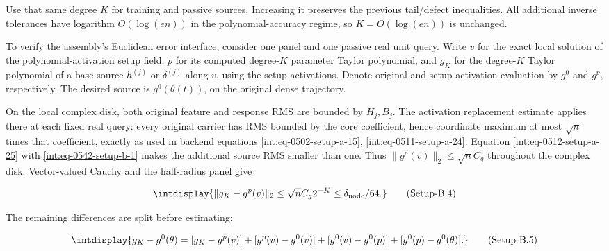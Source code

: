 
Use that same degree \(K\) for training and passive sources. Increasing it preserves the previous tail/defect inequalities. All additional inverse tolerances have logarithm \(O(\log(en))\) in the polynomial-accuracy regime, so \(K=O(\log(en))\) is unchanged.



To verify the assembly's Euclidean error interface, consider one panel and one passive real unit query. Write \(v\) for the exact local solution of the polynomial-activation setup field, \(p\) for its computed degree-\(K\) parameter Taylor polynomial, and \(g_K\) for the degree-\(K\) Taylor polynomial of a base source \(h^{(j)}\) or \(\delta^{(j)}\) along \(v\), using the setup activations. Denote original and setup activation evaluation by \(g^0\) and \(g^p\), respectively. The desired source is \(g^0(\theta(t))\), on the original dense trajectory.



On the local complex disk, both original feature and response RMS are bounded by \(H_j,\allowbreak B_j\). The activation replacement estimate applies there at each fixed real query: every original carrier has RMS bounded by the core coefficient, hence coordinate maximum at most \(\sqrt n\) times that coefficient, exactly as used in backend equations \hyperref[int:eq-setup-a-15]{\eqref{int:eq-0502-setup-a-15}}, \hyperref[int:eq-setup-a-24]{\eqref{int:eq-0511-setup-a-24}}. Equation \hyperref[int:eq-setup-a-25]{\eqref{int:eq-0512-setup-a-25}} with \hyperref[int:eq-setup-b-1]{\eqref{int:eq-0542-setup-b-1}} makes the additional source RMS smaller than one. Thus \(\|g^p(v)\|_2\le\sqrt n C_g\) throughout the complex disk. Vector-valued Cauchy and the half-radius panel give


\label{int:eq-setup-b-4}
\begingroup\renewcommand{\theHequation}{intdisplay.1036}
\begin{equation}
\intdisplay{
\|g_K-g^p(v)\|_2\le\sqrt n C_g2^{-K}
                         \le\delta_{\rm node}/64.
}
\tag{Setup-B.4}
\label{int:eq-0545-setup-b-4}
\end{equation}
\endgroup


The remaining differences are split before estimating:


\label{int:eq-setup-b-5}
\begingroup\renewcommand{\theHequation}{intdisplay.1037}
\begin{equation}
\intdisplay{
g_K-g^0(\theta)
=[g_K-g^p(v)]+[g^p(v)-g^0(v)]
 +[g^0(v)-g^0(p)]+[g^0(p)-g^0(\theta)].
}
\tag{Setup-B.5}
\label{int:eq-0546-setup-b-5}
\end{equation}
\endgroup

